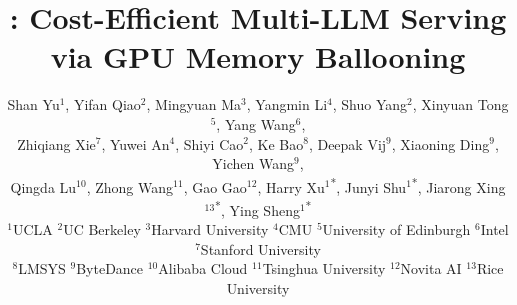 \documentclass[letterpaper,twocolumn,10pt]{article}
\begin{document}
\pagestyle{empty}

\title{\tool: Cost-Efficient Multi-LLM Serving via GPU Memory Ballooning}
\author
{
Shan Yu$^{1}$,\enspace
Yifan Qiao$^{2}$,\enspace
Mingyuan Ma$^{3}$,\enspace
Yangmin Li$^{4}$,\enspace
Shuo Yang$^{2}$, \enspace
Xinyuan Tong$^{5}$, \enspace
Yang Wang$^{6}$,\enspace\\
Zhiqiang Xie$^{7}$,\enspace
Yuwei An$^{4}$, \enspace
Shiyi Cao$^{2}$,\enspace
Ke Bao$^{8}$,\enspace
Deepak Vij$^{9}$, \enspace
Xiaoning Ding$^{9}$, \enspace
Yichen Wang$^{9}$, \enspace\\
Qingda Lu$^{10}$, \enspace
Zhong Wang$^{11}$, \enspace
Gao Gao$^{12}$, \enspace
Harry Xu$^{1}$\textsuperscript{*},\enspace
Junyi Shu$^{1}$\textsuperscript{*}, \enspace
Jiarong Xing$^{13}$\textsuperscript{*}, \enspace
Ying Sheng$^{1}$\textsuperscript{*}\\[0.5ex]
\vspace{1mm}
\normalsize
$^1$UCLA \quad
$^2$UC Berkeley \quad
$^3$Harvard University \quad
$^4$CMU \quad
$^5$University of Edinburgh \quad
$^6$Intel  \quad
$^7$Stanford University \\
\normalsize
$^8$LMSYS \quad
$^9$ByteDance \quad
$^{10}$Alibaba Cloud \quad
$^{11}$Tsinghua University\quad
$^{12}$Novita AI\quad
$^{13}$Rice University
}

\maketitle
{}












\normalsize


\clearpage
\appendix

\end{document}
